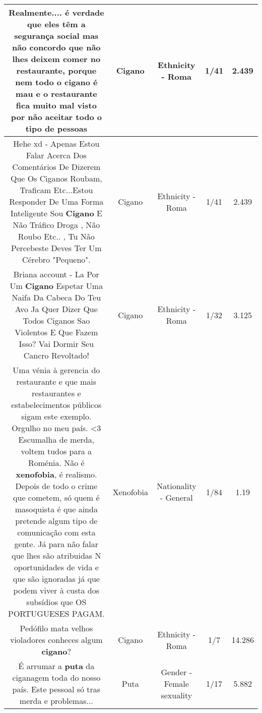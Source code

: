 \documentclass[11pt]{article}
\newlength\mylength
\begin{document}
\begin{center}
\begin{longtable}{|C{.65\mylength}|C{.30\mylength}|C{.12\mylength}|C{.12\mylength}|C{.12\mylength}|}
  \small Realmente.... é verdade que eles têm a segurança social mas não concordo que não lhes deixem comer no restaurante, porque nem todo o \textbf{cigano} é mau e o restaurante fica muito mal visto por não aceitar todo o tipo de pessoas\normalsize   & Cigano & Ethnicity - Roma & 1/41 & 2.439 \\  \hline
  \small Hehe xd - Apenas Estou Falar Acerca Dos Comentários De Dizerem Que Os Ciganos Roubam, Traficam Etc...Estou Responder De Uma Forma Inteligente Sou \textbf{Cigano} E Não Tráfico Droga , Não Roubo Etc.. , Tu Não Percebeste Deves Ter Um Cérebro "Pequeno".\normalsize   & Cigano & Ethnicity - Roma & 1/41 & 2.439 \\  \hline
  \small Briana account - La Por Um \textbf{Cigano} Espetar Uma Naifa Da Cabeca Do Teu Avo Ja Quer Dizer Que Todos Ciganos Sao Violentos E Que Fazem Isso? Vai Dormir Seu Cancro Revoltado!\normalsize   & Cigano & Ethnicity - Roma & 1/32 & 3.125 \\  \hline
  \small Uma vénia à gerencia do restaurante e que mais restaurantes e estabelecimentos públicos sigam este exemplo. Orgulho no meu país. <3 Escumalha de merda, voltem tudos para a Roménia. Não é \textbf{xenofobia}, é realismo. Depois de todo o crime que cometem, só quem é masoquista é que ainda pretende algum tipo de comunicação com esta gente. Já para não falar que lhes são atribuidas N oportunidades de vida e que são ignoradas já que podem viver à custa dos subsídios que OS PORTUGUESES PAGAM.\normalsize   & Xenofobia & Nationality - General & 1/84 & 1.19 \\  \hline
  \small Pedófilo   mata velhos violadores conheces algum \textbf{cigano}?\normalsize   & Cigano & Ethnicity - Roma & 1/7 & 14.286 \\  \hline
  \small É arrumar a \textbf{puta} da ciganagem toda do nosso país. Este pessoal só tras merda e problemas...\normalsize   & Puta & Gender - Female sexuality & 1/17 & 5.882 \\  \hline

\end{longtable}
\end{center}
\end{document}

